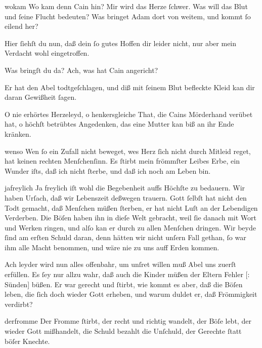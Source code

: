 \documentclass[tocstyle=ref-genre]{ees}
\begin{document}
{\begin{movement}{wokam}
  \voice[Eva]
  Wo kam denn Cain hin? Mir wird das Herze ſchwer.
  Was will das Blut und ſeine Flucht bedeuten?
  Was bringet Adam dort von weitem,
  und kommt ſo eilend her?

  \voice[Adam]
  Hier ſiehſt du nun, daß dein ſo gutes Hoffen
  dir leider nicht,
  nur aber mein Verdacht wohl eingetroffen.

  \voice[Eva]
  Was bringſt du da? Ach, was hat Cain angericht?

  \voice[Adam]
  Er hat den Abel todtgeſchlagen,
  und diß mit ſeinem Blut befleckte Kleid
  kan dir daran Gewißheit ſagen.

  \voice[Eva]
  O nie erhörtes Herzeleyd,
  o henkersgleiche That,
  die Cains Mörderhand verübet hat,
  o höchſt betrübtes Angedenken,
  das eine Mutter kan biß an ihr Ende kränken.
\end{movement}

\begin{movement}{wenso}
  \voice[Eva]
  Wen ſo ein Zufall nicht beweget,
  wes Herz ſich nicht durch Mitleid reget,
  hat keinen rechten Menſchenſinn.
  Es ſtirbt mein frömmſter Leibes Erbe,
  ein Wunder iſts, daß ich nicht ſterbe,
  und daß ich noch am Leben bin.
\end{movement}

\begin{movement}{jafreylich}
  \voice[Adam]
  Ja freylich iſt wohl die Begebenheit
  auffs Höchſte zu bedauern.
  Wir haben Urſach, daß wir Lebenszeit
  deßwegen trauern.
  Gott ſelbſt hat nicht den Todt gemacht,
  daß Menſchen müßen ſterben,
  er hat nicht Luſt
  an der Lebendigen Verderben.
  Die Böſen haben ihn in dieſe Welt gebracht,
  weil ſie danach mit Wort und Werken ringen,
  und alſo kan er durch zu allen Menſchen dringen.
  Wir beyde ſind am erſten Schuld daran,
  denn hätten wir nicht unſern Fall gethan,
  ſo war ihm alle Macht benommen,
  und wäre nie zu uns auff Erden kommen.

  \voice[Eva]
  Ach leyder wird nun alles offenbahr,
  um unſret willen
  muß Abel uns zuerſt erfüllen.
  Es ſey nur allzu wahr,
  daß auch die Kinder müßen
  der Eltern Fehler [: Sünden] büßen.
  Er war gerecht und ſtirbt,
  wie kommt es aber, daß die Böſen leben,
  die ſich doch wieder Gott erheben,
  und warum duldet er, daß Frömmigkeit verdirbt?
\end{movement}

\begin{movement}{derfromme}
  \voice[Chor]
  Der Fromme ſtirbt, der recht und richtig wandelt,
  der Böſe lebt, der wieder Gott mißhandelt,
  die Schuld bezahlt die Unſchuld, der Gerechte
  ſtatt böſer Knechte.
\end{movement}

}
\end{document}
